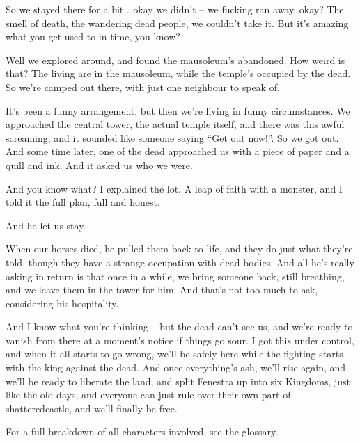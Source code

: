 \begin{multicols}{2}
\begin{exampletext}
	So we stayed there for a bit \ldots okay we didn't -- we fucking ran away, okay?  The smell of death, the wandering dead people, we couldn't take it.
But it's amazing what you get used to in time, you know?

	Well we explored around, and found the mausoleum's abandoned.
How weird is that?
The living are in the mausoleum, while the temple's occupied by the dead.
So we're camped out there, with just one neighbour to speak of.

	It's been a funny arrangement, but then we're living in funny circumstances.  We approached the central tower, the actual temple itself, and there was this awful screaming, and it sounded like someone saying ``Get out now!''.  So we got out.  And some time later, one of the dead approached us with a piece of paper and a quill and ink.  And it asked us who we were.

	And you know what?  I explained the lot.  A leap of faith with a monster, and I told it the full plan, full and honest.

	And he let us stay.

	When our horses died, he pulled them back to life, and they do just what they're told, though they have a strange occupation with dead bodies.  And all he's really asking in return is that once in a while, we bring someone back, still breathing, and we leave them in the tower for him.  And that's not too much to ask, considering his hospitality.

	And I know what you're thinking -- but the dead can't see us, and we're ready to vanish from there at a moment's notice if things go sour.  I got this under control, and when it all starts to go wrong, we'll be safely here while the fighting starts with the king against the dead.  And once everything's ash, we'll rise again, and we'll be ready to liberate the land, and split Fenestra up into six Kingdoms, just like the old days, and everyone can just rule over their own part of \gls{shatteredcastle}, and we'll finally be free.

\end{exampletext}

For a full breakdown of all characters involved, see the glossary.

\end{multicols}
